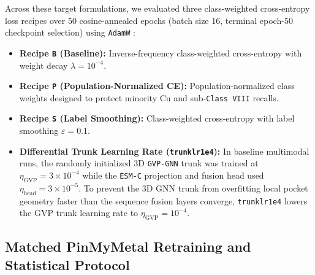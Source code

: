 \documentclass[10pt,a4paper,twocolumn]{article}
\begin{document}
Across these target formulations, we evaluated three class-weighted cross-entropy loss recipes over 50 cosine-annealed epochs (batch size 16, terminal epoch-50 checkpoint selection) using \texttt{AdamW} \cite{loshchilov2019adamw}:
\begin{itemize}
  \item \textbf{Recipe \texttt{B} (Baseline):} Inverse-frequency class-weighted cross-entropy with weight decay $\lambda = 10^{-4}$.
  \item \textbf{Recipe \texttt{P} (Population-Normalized CE):} Population-normalized class weights designed to protect minority $\text{Cu}$ and sub-\texttt{Class VIII} recalls.
  \item \textbf{Recipe \texttt{S} (Label Smoothing):} Class-weighted cross-entropy with label smoothing $\varepsilon = 0.1$.
  \item \textbf{Differential Trunk Learning Rate (\texttt{trunklr1e4}):} In baseline multimodal runs, the randomly initialized 3D \texttt{GVP-GNN} trunk was trained at $\eta_{\text{GVP}} = 3 \times 10^{-4}$ while the \texttt{ESM-C} projection and fusion head used $\eta_{\text{head}} = 3 \times 10^{-5}$. To prevent the 3D GNN trunk from overfitting local pocket geometry faster than the sequence fusion layers converge, \texttt{trunklr1e4} lowers the GVP trunk learning rate to $\eta_{\text{GVP}} = 10^{-4}$.
\end{itemize}

\subsection{Matched PinMyMetal Retraining and Statistical Protocol}
\end{document}
